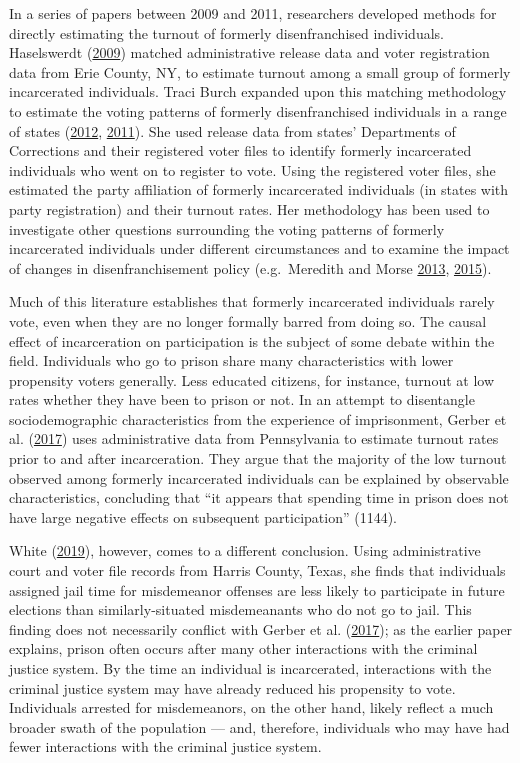 \documentclass[
  12pt,
]{article}
\begin{document}
In a series of papers between 2009 and 2011, researchers developed methods for directly estimating the turnout of formerly disenfranchised individuals. Haselswerdt (\protect\hyperlink{ref-Haselswerdt2009}{2009}) matched administrative release data and voter registration data from Erie County, NY, to estimate turnout among a small group of formerly incarcerated individuals. Traci Burch expanded upon this matching methodology to estimate the voting patterns of formerly disenfranchised individuals in a range of states (\protect\hyperlink{ref-Burch2012}{2012}, \protect\hyperlink{ref-Burch2011}{2011}). She used release data from states' Departments of Corrections and their registered voter files to identify formerly incarcerated individuals who went on to register to vote. Using the registered voter files, she estimated the party affiliation of formerly incarcerated individuals (in states with party registration) and their turnout rates. Her methodology has been used to investigate other questions surrounding the voting patterns of formerly incarcerated individuals under different circumstances and to examine the impact of changes in disenfranchisement policy (e.g.~Meredith and Morse \protect\hyperlink{ref-Meredith2013}{2013}, \protect\hyperlink{ref-Meredith2015}{2015}).

Much of this literature establishes that formerly incarcerated individuals rarely vote, even when they are no longer formally barred from doing so. The causal effect of incarceration on participation is the subject of some debate within the field. Individuals who go to prison share many characteristics with lower propensity voters generally. Less educated citizens, for instance, turnout at low rates whether they have been to prison or not. In an attempt to disentangle sociodemographic characteristics from the experience of imprisonment, Gerber et al. (\protect\hyperlink{ref-Gerber2017}{2017}) uses administrative data from Pennsylvania to estimate turnout rates prior to and after incarceration. They argue that the majority of the low turnout observed among formerly incarcerated individuals can be explained by observable characteristics, concluding that ``it appears that spending time in prison does not have large negative effects on subsequent participation'' (1144).

White (\protect\hyperlink{ref-White2019}{2019}), however, comes to a different conclusion. Using administrative court and voter file records from Harris County, Texas, she finds that individuals assigned jail time for misdemeanor offenses are less likely to participate in future elections than similarly-situated misdemeanants who do not go to jail. This finding does not necessarily conflict with Gerber et al. (\protect\hyperlink{ref-Gerber2017}{2017}); as the earlier paper explains, prison often occurs after many other interactions with the criminal justice system. By the time an individual is incarcerated, interactions with the criminal justice system may have already reduced his propensity to vote. Individuals arrested for misdemeanors, on the other hand, likely reflect a much broader swath of the population --- and, therefore, individuals who may have had fewer interactions with the criminal justice system.
\end{document}
